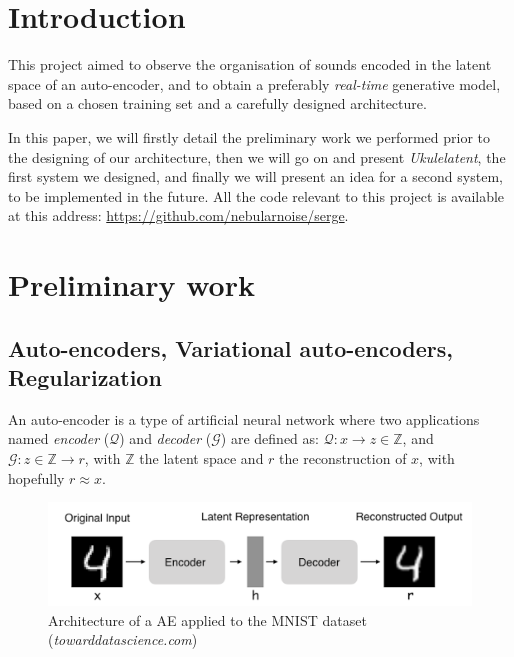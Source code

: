\documentclass[11pt, english]{article}
\begin{document}
\newcommand{\CC}{C\nolinebreak\hspace{-.05em}\raisebox{.4ex}{\tiny\bf +}\nolinebreak\hspace{-.10em}\raisebox{.4ex}{\tiny\bf +}}
\def\CC{{C\nolinebreak[4]\hspace{-.05em}\raisebox{.4ex}{\tiny\bf ++}}}

\tableofcontents
\newpage
\section*{Introduction}

This project aimed to observe the organisation of sounds encoded in the latent space of an auto-encoder, and to obtain a preferably \textit{real-time} generative model, based on a chosen training set and a carefully designed architecture.

In this paper, we will firstly detail the preliminary work we performed prior to the designing of our architecture, then we will go on and present \textit{Ukulelatent}, the first system we designed, and finally we will present an idea for a second system, to be implemented in the future.
All the code relevant to this project is available at this address: \href{https://github.com/nebularnoise/serge}{https://github.com/nebularnoise/serge}.

\section{Preliminary work}
\subsection{Auto-encoders, Variational auto-encoders, Regularization}

An auto-encoder is a type of artificial neural network where two applications named \textit{encoder} ($\mathcal Q$) and \textit{decoder} ($\mathcal G$) are defined as: $\mathcal Q: x \longrightarrow z \in \mathbb Z$, and $\mathcal G: z \in \mathbb Z \longrightarrow r$, with $\mathbb Z$ the latent space and $r$ the reconstruction of $x$, with hopefully $r \approx x$.

\begin{figure}[!h]
    \centering
    \includegraphics[width=.7\linewidth]{img/architecture_ae.png}
    \caption{Architecture of a AE applied to the MNIST dataset (\textit{towarddatascience.com})}
    \label{fig:schema_AE}
\end{figure}
\end{document}
